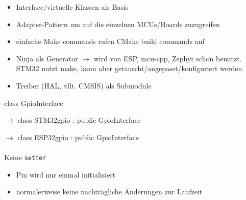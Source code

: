 \begin{itemize}
	\item Interface/virtuelle Klassen als Basis
	\item Adapter-Pattern um auf die einzelnen MCUs/Boards zuzugreifen
	\item einfache Make commands rufen CMake build commands auf
	\item Ninja als Generator $\rightarrow$ wird von ESP, mcu-cpp, Zephyr schon benutzt. STM32 nutzt make, kann aber getauscht/angepasst/konfiguriert werden
	\item Treiber (HAL, vllt. CMSIS) als Submodule
\end{itemize}

class GpioInterface

$\rightarrow$ class STM32gpio : public GpioInterface

$\rightarrow$ class ESP32gpio : public GpioInterface
\\
\\
Keine \texttt{setter}
\begin{itemize}
	\item Pin wird nur einmal initialisiert
	\item normalerweise keine nachträgliche Änderungen zur Laufzeit
\end{itemize}

